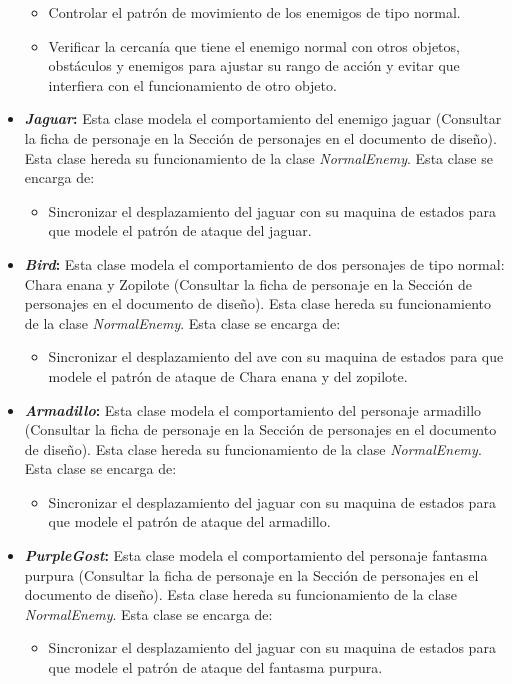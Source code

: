 \begin{itemize}
\begin{itemize}
				\item Controlar el patrón de movimiento de los enemigos de tipo 
				normal.
				\item  Verificar la cercanía que tiene el enemigo normal con otros objetos, 
				obstáculos y enemigos para ajustar su rango de acción y evitar que interfiera con el 
				funcionamiento de otro objeto.
			\end{itemize}					
			\item \textbf{\textit{Jaguar}:} Esta clase modela el comportamiento del enemigo jaguar 
			(Consultar la ficha de personaje en la Sección de personajes en el documento de diseño). 
			Esta clase hereda su funcionamiento de la clase \textit{NormalEnemy}. Esta 
			clase se encarga de:  
			\begin{itemize}
				\item Sincronizar el desplazamiento del jaguar con su maquina de estados para que modele
				el patrón de ataque del jaguar. 
			\end{itemize}
			\item \textbf{\textit{Bird}:} Esta clase modela el comportamiento de dos personajes de tipo
			normal: Chara enana y Zopilote (Consultar la ficha de personaje en la Sección de personajes en 
			el documento de diseño). Esta clase hereda su funcionamiento de la clase 
			\textit{NormalEnemy}. Esta clase se encarga de:  
			\begin{itemize}
				\item Sincronizar el desplazamiento del ave con su maquina de estados para que modele
				el patrón de ataque de Chara enana y del zopilote. 
			\end{itemize}
			\item \textbf{\textit{Armadillo}:} Esta clase modela el comportamiento del personaje 
			armadillo (Consultar la ficha de personaje en la Sección de personajes en 
			el documento de diseño). Esta clase hereda su funcionamiento de la clase 
			\textit{NormalEnemy}. Esta clase se encarga de:  
			\begin{itemize}
				\item Sincronizar el desplazamiento del jaguar con su maquina de estados para que modele
				el patrón de ataque del armadillo. 
			\end{itemize}
			\item \textbf{\textit{PurpleGost}:} Esta clase modela el comportamiento del personaje 
			fantasma purpura (Consultar la ficha de personaje en la Sección de personajes en 
			el documento de diseño). Esta clase hereda su funcionamiento de la clase 
			\textit{NormalEnemy}. Esta clase se encarga de:  
			\begin{itemize}
				\item Sincronizar el desplazamiento del jaguar con su maquina de estados para que modele
				el patrón de ataque del fantasma purpura. 
			\end{itemize}
			

\end{itemize}
